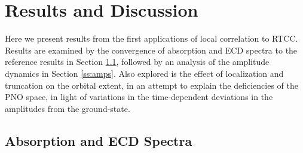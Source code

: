
\section{Results and Discussion} \label{se:results} 
Here we present results from the first applications of local correlation to RTCC.
Results are examined
by the convergence of absorption and ECD spectra to the reference results
in Section \ref{ss:spectra}, followed by an analysis of the amplitude
dynamics in Section \ref{ss:amps}. Also explored is the effect
of localization and truncation on the orbital extent, in an
attempt to explain the deficiencies of the PNO space, in light of 
variations in the time-dependent deviations in the amplitudes from the 
ground-state.

\subsection{Absorption and ECD Spectra} \label{ss:spectra}
